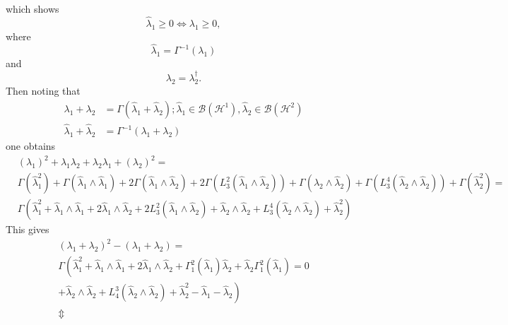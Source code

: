 \documentclass[aps,preprint]{revtex4}%
\begin{document}
which shows
\begin{equation}
\hat{\lambda}_{1}\geq0\Leftrightarrow\lambda_{1}\geq0,
\end{equation}
where
\begin{equation}
\hat{\lambda}_{1}=\Gamma^{-1}\left(  \lambda_{1}\right)
\end{equation}
and
\begin{equation}
\lambda_{2}=\lambda_{2}^{\dagger}.
\end{equation}
Then noting that
\begin{align}
\lambda_{1}+\lambda_{2}  &  =\Gamma\left(  \hat{\lambda}_{1}+\hat{\lambda}%
_{2}\right)  ;\hat{\lambda}_{1}\in\mathcal{B}\left(  \mathcal{H}^{1}\right)
,\hat{\lambda}_{2}\in\mathcal{B}\left(  \mathcal{H}^{2}\right) \nonumber\\
\hat{\lambda}_{1}+\hat{\lambda}_{2}  &  =\Gamma^{-1}\left(  \lambda
_{1}+\lambda_{2}\right)
\end{align}
one obtains%
\begin{align}
&  \left(  \lambda_{1}\right)  ^{2}+\lambda_{1}\lambda_{2}+\lambda_{2}%
\lambda_{1}+\left(  \lambda_{2}\right)  ^{2}=\nonumber\\
&  \Gamma\left(  \hat{\lambda}_{1}^{2}\right)  +\Gamma\left(  \hat{\lambda
}_{1}\wedge\hat{\lambda}_{1}\right)  +2\Gamma\left(  \hat{\lambda}_{1}%
\wedge\hat{\lambda}_{2}\right)  +2\Gamma\left(  L_{3}^{2}\left(  \hat{\lambda
}_{1}\wedge\hat{\lambda}_{2}\right)  \right)  +\Gamma\left(  \hat{\lambda}%
_{2}\wedge\hat{\lambda}_{2}\right)  +\Gamma\left(  L_{3}^{4}\left(
\hat{\lambda}_{2}\wedge\hat{\lambda}_{2}\right)  \right)  +\Gamma\left(
\hat{\lambda}_{2}^{2}\right)  =\nonumber\\
&  \Gamma\left(  \hat{\lambda}_{1}^{2}+\hat{\lambda}_{1}\wedge\hat{\lambda
}_{1}+2\hat{\lambda}_{1}\wedge\hat{\lambda}_{2}+2L_{3}^{2}\left(  \hat
{\lambda}_{1}\wedge\hat{\lambda}_{2}\right)  +\hat{\lambda}_{2}\wedge
\hat{\lambda}_{2}+L_{3}^{4}\left(  \hat{\lambda}_{2}\wedge\hat{\lambda}%
_{2}\right)  +\hat{\lambda}_{2}^{2}\right)
\end{align}
This gives
\begin{gather}
\left(  \lambda_{1}+\lambda_{2}\right)  ^{2}-\left(  \lambda_{1}+\lambda
_{2}\right)  =\nonumber\\
\Gamma\left(  \hat{\lambda}_{1}^{2}+\hat{\lambda}_{1}\wedge\hat{\lambda}%
_{1}+2\hat{\lambda}_{1}\wedge\hat{\lambda}_{2}+\Gamma_{1}^{2}\left(
\hat{\lambda}_{1}\right)  \hat{\lambda}_{2}+\hat{\lambda}_{2}\Gamma_{1}%
^{2}\left(  \hat{\lambda}_{1}\right)  \right.  =0\nonumber\\
\left.  +\hat{\lambda}_{2}\wedge\hat{\lambda}_{2}+L_{4}^{3}\left(
\hat{\lambda}_{2}\wedge\hat{\lambda}_{2}\right)  +\hat{\lambda}_{2}^{2}%
-\hat{\lambda}_{1}-\hat{\lambda}_{2}\right) \\
\Updownarrow\nonumber
\end{gather}%
\end{document}
